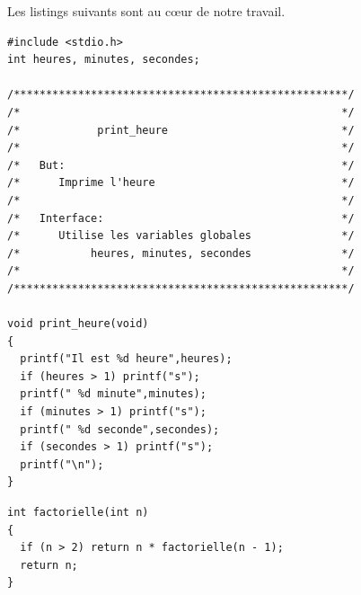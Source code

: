 \documentclass[12pt,space=onehalf,version=final]{yathesis}
\begin{document}
Les listings suivants sont au cœur de notre travail.

\begin{lstlisting}[caption={Il est l'heure}]
#include <stdio.h>
int heures, minutes, secondes;

/****************************************************/
/*                                                  */
/*            print_heure                           */
/*                                                  */
/*   But:                                           */
/*      Imprime l'heure                             */
/*                                                  */
/*   Interface:                                     */
/*      Utilise les variables globales              */
/*           heures, minutes, secondes              */
/*                                                  */
/****************************************************/

void print_heure(void)
{
  printf("Il est %d heure",heures);
  if (heures > 1) printf("s");
  printf(" %d minute",minutes);
  if (minutes > 1) printf("s");
  printf(" %d seconde",secondes);
  if (secondes > 1) printf("s");
  printf("\n");
}
\end{lstlisting}
\begin{lstlisting}[caption={Factorielle}]
int factorielle(int n)
{
  if (n > 2) return n * factorielle(n - 1);
  return n;
}
\end{lstlisting}
%
\backmatter
%
\printglossary
%
\printindex
%
\tableofcontents
%
\makebackcover
%
\end{document}
